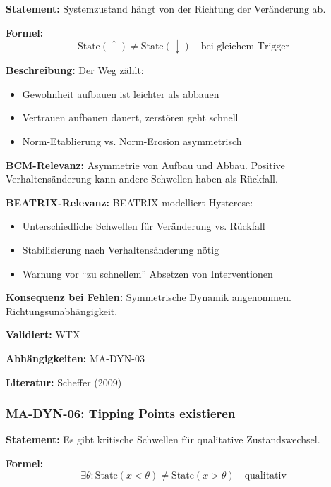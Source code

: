 \textbf{Statement:} Systemzustand hängt von der Richtung der Veränderung ab.

\textbf{Formel:}
\begin{equation}
\text{State}(\uparrow) \neq \text{State}(\downarrow) \quad \text{bei gleichem Trigger}
\end{equation}

\textbf{Beschreibung:}
Der Weg zählt:
\begin{itemize}
    \item Gewohnheit aufbauen ist leichter als abbauen
    \item Vertrauen aufbauen dauert, zerstören geht schnell
    \item Norm-Etablierung vs. Norm-Erosion asymmetrisch
\end{itemize}

\textbf{BCM-Relevanz:}
Asymmetrie von Aufbau und Abbau. Positive Verhaltensänderung kann andere Schwellen haben als Rückfall.

\textbf{BEATRIX-Relevanz:}
BEATRIX modelliert Hysterese:
\begin{itemize}
    \item Unterschiedliche Schwellen für Veränderung vs. Rückfall
    \item Stabilisierung nach Verhaltensänderung nötig
    \item Warnung vor ``zu schnellem'' Absetzen von Interventionen
\end{itemize}

\textbf{Konsequenz bei Fehlen:}
Symmetrische Dynamik angenommen. Richtungsunabhängigkeit.

\textbf{Validiert:} WTX

\textbf{Abhängigkeiten:} MA-DYN-03

\textbf{Literatur:} Scheffer (2009)


\subsubsection*{MA-DYN-06: Tipping Points existieren}

\textbf{Statement:} Es gibt kritische Schwellen für qualitative Zustandswechsel.

\textbf{Formel:}
\begin{equation}
\exists \theta: \text{State}(x < \theta) \neq \text{State}(x > \theta) \quad \text{qualitativ}
\end{equation}


